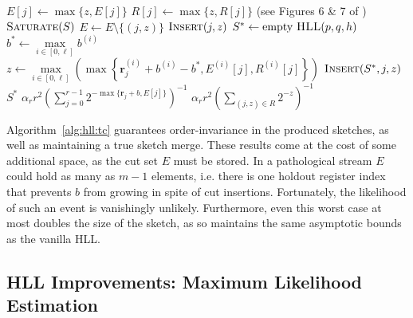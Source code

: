 \documentclass{report}
\newcommand{\algoname}[1]{\textnormal{\textsc{#1}}}
\begin{document}
\begin{algorithm}[htbp]
\begin{algorithmic}[1]
				\State $E[j] \gets \max \{z, E[j]\}$
			\EndIf
		\ElsIf {$\nu = \algoname{sparse}$}
			\State $R[j] \gets \max \{z, R[j]\}$ (see Figures 6 \& 7 of \cite{heule2013hyperloglog})
				\State $\algoname{Saturate}(S)$
			\EndIf
		\EndIf
	\EndFunction
%
			\State $E \gets E \setminus \{(j, z)\}$
			\State $\algoname{Insert}(j, z)$
		\EndFor
	\EndFunction
%
%
		\State $S^* \gets \text{empty $\algoname{HLL}(p, q, h)$}$
		\For{$j \in [0,r)$} 
			\State $b^* \gets \max\limits_{i \in [0, \ell]} b^{(i)}$
			\State $z \gets  \max\limits_{ i \in [0, \ell]} \left ( \max \left \{ \mathbf{r}^{(i)}_j + b^{(i)} - b^{*}, E^{(i)}[j], R^{(i)}[j] \right \} \right )$
				\State $\algoname{Insert}(S^*, j, z)$
			\EndIf
		\EndFor
		\State \Return $S^*$
	\EndFunction
%
		\If{$\nu = \algoname{dense}$}
			\State \Return $\alpha_r r^2 \left ( \sum\limits_{j=0}^{r-1} 2^{-\max \{ \mathbf{r}_j + b, E[j]\}} \right) ^{-1}$
		\Else
			\State \Return $\alpha_r r^2 \left ( \sum\limits_{(j, z) \in R} 2^{-z} \right) ^{-1}$
		\EndIf
	\EndFunction
\end{algorithmic}
\end{algorithm}


Algorithm~\ref{alg:hll:tc} guarantees order-invariance in the produced sketches, as well as maintaining a true sketch merge.
These results come at the cost of some additional space, as the cut set $E$ must be stored.
In a pathological stream $E$ could hold as many as $m-1$ elements, i.e. there is one holdout register index that prevents $b$ from growing in spite of cut insertions. 
Fortunately, the likelihood of such an event is vanishingly unlikely. 
Furthermore, even this worst case at most doubles the size of the sketch, as so maintains the same asymptotic bounds as the vanilla \algoname{HLL}.


\subsection{\algoname{HLL} Improvements: Maximum Likelihood Estimation}
 \label{DS:sec:HLL:MLE}
\end{document}
